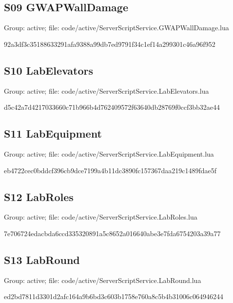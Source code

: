 \subsection{S09 GWAPWallDamage}
Group: active; file: code/\allowbreak{}active/\allowbreak{}ServerScriptService.\allowbreak{}GWAPWallDamage.\allowbreak{}lua

\begin{flushleft}\ttfamily\footnotesize 92a3df3c35188633291afa9388a99db7ed9791f34c1ef14a299301c46a96f952\end{flushleft}
\subsection{S10 LabElevators}
Group: active; file: code/\allowbreak{}active/\allowbreak{}ServerScriptService.\allowbreak{}LabElevators.\allowbreak{}lua

\begin{flushleft}\ttfamily\footnotesize d5c42a7d4217033660c71b966b4d762409572f63640db28769f0ccf3bb32ae44\end{flushleft}
\subsection{S11 LabEquipment}
Group: active; file: code/\allowbreak{}active/\allowbreak{}ServerScriptService.\allowbreak{}LabEquipment.\allowbreak{}lua

\begin{flushleft}\ttfamily\footnotesize eb4722cec0bddcf396cb9dce7199a4b11dc3890fc157367daa219c1489fdae5f\end{flushleft}
\subsection{S12 LabRoles}
Group: active; file: code/\allowbreak{}active/\allowbreak{}ServerScriptService.\allowbreak{}LabRoles.\allowbreak{}lua

\begin{flushleft}\ttfamily\footnotesize 7e706724edacbda6ccd335320891a5c8652a016640abe3e7fda6754203a39a77\end{flushleft}
\subsection{S13 LabRound}
Group: active; file: code/\allowbreak{}active/\allowbreak{}ServerScriptService.\allowbreak{}LabRound.\allowbreak{}lua

\begin{flushleft}\ttfamily\footnotesize ed2bd7811d3301d2afc164a9b6bd3c603b1758e760a8c5b4b31006c064946244\end{flushleft}
